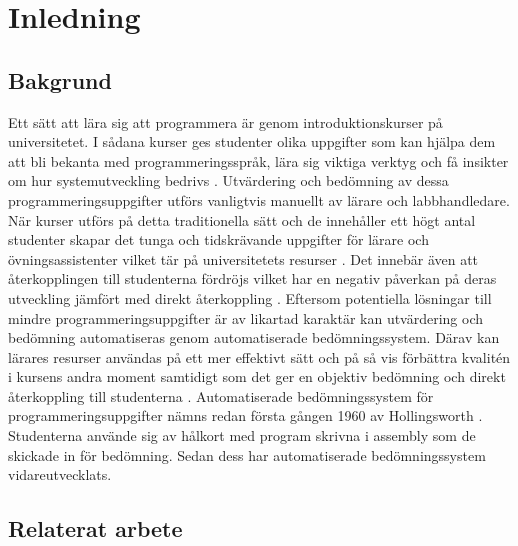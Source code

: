 \documentclass[a4paper,11pt]{article}
\begin{document}
{\newpage

\mbox{}

\newpage
\tableofcontents
\newpage
\ifodd\value{page}\else\mbox{}\newpage\fi
\setcounter{page}{1}
\renewcommand{\thepage}{\rempage}

\section{Inledning}

\subsection{Bakgrund}\label{Bakgrund}

Ett sätt att lära sig att programmera är genom introduktionskurser på universitetet. I sådana kurser ges studenter olika uppgifter som kan hjälpa dem att bli bekanta med programmeringsspråk, lära sig viktiga verktyg och få insikter om hur systemutveckling bedrivs \cite{douce_11}. Utvärdering och bedömning av dessa programmeringsuppgifter utförs vanligtvis manuellt av lärare och labbhandledare. När kurser utförs på detta traditionella sätt och de innehåller ett högt antal studenter skapar det tunga och tidskrävande uppgifter för lärare och övningsassistenter vilket tär på universitetets resurser \cite{douce_11}. Det innebär även att återkopplingen till studenterna fördröjs vilket har en negativ påverkan på deras utveckling jämfört med direkt återkoppling \cite{japanerna_1}. Eftersom potentiella lösningar till mindre programmeringsuppgifter är av likartad karaktär kan utvärdering och bedömning automatiseras genom automatiserade bedömningssystem. Därav kan lärares resurser användas på ett mer effektivt sätt och på så vis förbättra kvalitén i kursens andra moment samtidigt som det ger en objektiv bedömning och direkt återkoppling till studenterna \cite{douce_11} \cite{hollingsworth_2} \cite{higgins_3}. Automatiserade bedömningssystem för programmeringsuppgifter nämns redan första gången 1960 av Hollingsworth \cite{hollingsworth_2}. Studenterna använde sig av hålkort med program skrivna i assembly som de skickade in för bedömning. Sedan dess har automatiserade bedömningssystem vidareutvecklats.

\subsection{Relaterat arbete}

}
\end{document}
